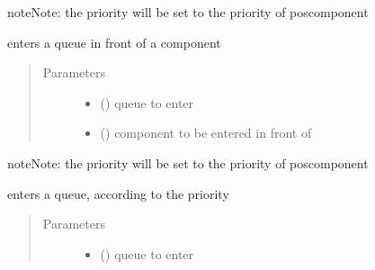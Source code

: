 \documentclass[letterpaper,10pt,english]{sphinxmanual}
\begin{document}
\begin{fulllineitems}
\begin{fulllineitems}
\begin{sphinxadmonition}{note}{Note:}
the priority will be set to the priority of poscomponent
\end{sphinxadmonition}

\end{fulllineitems}


\begin{fulllineitems}
\label{\detokenize{Reference:salabim.Component.enter_in_front_of}}
enters a queue in front of a component
\begin{quote}\begin{description}
\item[{Parameters}] \leavevmode\begin{itemize}
\item {} 
 ({\hyperref[\detokenize{Reference:salabim.Queue}]{}}) \textendash{} queue to enter

\item {} 
 ({\hyperref[\detokenize{Reference:salabim.Component}]{}}) \textendash{} component to be entered in front of

\end{itemize}

\end{description}\end{quote}

\begin{sphinxadmonition}{note}{Note:}
the priority will be set to the priority of poscomponent
\end{sphinxadmonition}

\end{fulllineitems}


\begin{fulllineitems}
\label{\detokenize{Reference:salabim.Component.enter_sorted}}
enters a queue, according to the priority
\begin{quote}\begin{description}
\item[{Parameters}] \leavevmode\begin{itemize}
\item {} 
 ({\hyperref[\detokenize{Reference:salabim.Queue}]{}}) \textendash{} queue to enter


\end{itemize}
\end{description}
\end{quote}
\end{fulllineitems}
\end{fulllineitems}
\end{document}
